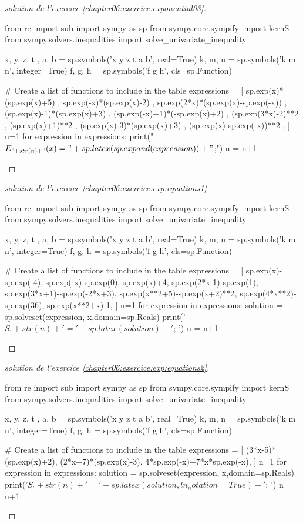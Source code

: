 \documentclass[main.tex]{subfiles}
\begin{document}
\begin{proof}[solution de l'exercice \ref{chapter06:exercice:exponential03}]  \scriptsize
\noindent
\begin{pycode}
from re import sub
import sympy as sp
from sympy.core.sympify import kernS
from sympy.solvers.inequalities import solve_univariate_inequality

x, y, z, t , a, b = sp.symbols('x y z t a b', real=True)
k, m, n = sp.symbols('k m n', integer=True)
f, g, h = sp.symbols('f g h', cls=sp.Function)

# Create a list of functions to include in the table
expressions = [
sp.exp(x)*(sp.exp(x)+5) ,
sp.exp(-x)*(sp.exp(x)-2) ,
sp.exp(2*x)*(sp.exp(x)-sp.exp(-x)) ,
(sp.exp(x)-1)*(sp.exp(x)+3) ,
(sp.exp(-x)+1)*(-sp.exp(x)+2) ,
(sp.exp(3*x)-2)**2 ,
(sp.exp(x)+1)**2 ,
(sp.exp(x)-3)*(sp.exp(x)+3) ,
(sp.exp(x)-sp.exp(-x))**2 ,
]
n=1
for expression in expressions:
	print("$E_{"+str(n)+ "}(x)="+   sp.latex(sp.expand(expression)) +"$;\;")
	n = n+1
\end{pycode}
\end{proof}
\begin{proof}[solution de l'exercice \ref{chapter06:exercice:exp:equations1}]  \scriptsize
\noindent
\begin{pycode}
from re import sub
import sympy as sp
from sympy.core.sympify import kernS
from sympy.solvers.inequalities import solve_univariate_inequality

x, y, z, t , a, b = sp.symbols('x y z t a b', real=True)
k, m, n = sp.symbols('k m n', integer=True)
f, g, h = sp.symbols('f g h', cls=sp.Function)

# Create a list of functions to include in the table
expressions = [
sp.exp(x)-sp.exp(-4),
sp.exp(-x)-sp.exp(0),
sp.exp(x)+4,
sp.exp(2*x-1)-sp.exp(1),
sp.exp(3*x+1)-sp.exp(-2*x+3),
sp.exp(x**2+5)-sp.exp(x+2)**2,
sp.exp(4*x**2)-sp.exp(36),
sp.exp(x**2+x)-1,
]
n=1
for expression in expressions:
	solution = sp.solveset(expression, x,domain=sp.Reals)
	print('$S_'+ str(n)+ '=' +  sp.latex(solution ) + '$; ')
	n = n+1
\end{pycode}
\end{proof}
\begin{proof}[solution de l'exercice \ref{chapter06:exercice:exp:equations2}]  \scriptsize
\noindent
\begin{pycode}
from re import sub
import sympy as sp
from sympy.core.sympify import kernS
from sympy.solvers.inequalities import solve_univariate_inequality

x, y, z, t , a, b = sp.symbols('x y z t a b', real=True)
k, m, n = sp.symbols('k m n', integer=True)
f, g, h = sp.symbols('f g h', cls=sp.Function)

# Create a list of functions to include in the table
expressions = [
(3*x-5)*(sp.exp(x)+2),
(2*x+7)*(sp.exp(x)-3),
4*sp.exp(-x)+7*x*sp.exp(-x),
]
n=1
for expression in expressions:
	solution = sp.solveset(expression, x,domain=sp.Reals)
	print('$S_'+ str(n)+ '=' +  sp.latex(solution,ln_notation=True ) + '$; ')
	n = n+1
\end{pycode}
\end{proof}
\end{document}
